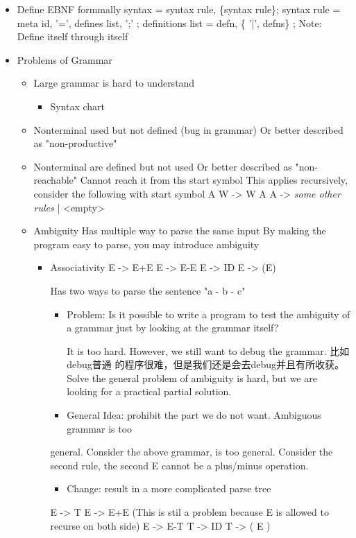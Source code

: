 \documentclass[11pt]{article}
\begin{document}
\begin{itemize}
\item Define EBNF formmally
syntax = syntax rule, \{syntax rule\};
syntax rule = meta id, '=', defines list, ';' ;
definitions list = defn, \{ '|', defns\} ;
Note: Define itself through itself

\item Problems of Grammar
\begin{itemize}
\item Large grammar is hard to understand
\begin{itemize}
\item Syntax chart
\end{itemize}
\item Nonterminal used but not defined (bug in grammar)
Or better described as "non-productive"
\item Nonterminal are defined but not used
Or better described as "non-reachable"
Cannot reach it from ths start symbol
This applies recursively, consider the following with start symbol A
W -> W A
A -> \emph{some other rules} | <empty>

\item Ambiguity
Has multiple way to parse the same input
By making the program easy to parse, you may introduce ambiguity

\begin{itemize}
\item Associativity
E -> E+E
E -> E-E
E -> ID
E -> (E)

Has two ways to parse the sentence "a - b - c"

\begin{itemize}
\item Problem: Is it possible to write a program to test the ambiguity of a
grammar just by looking at the grammar itself?

It is too hard. However, we still want to debug the grammar. 比如debug普通
的程序很难，但是我们还是会去debug并且有所收获。Solve the general problem
of ambiguity is hard, but we are looking for a practical partial solution.

\item General Idea: prohibit the part we do not want. Ambiguous grammar is too
\end{itemize}
general. Consider the above grammar, is too general. Consider the second
rule, the second E cannot be a plus/minus operation.

\begin{itemize}
\item Change: result in a more complicated parse tree
\end{itemize}
E -> T
E -> E+E (This is stil a problem because E is allowed to recurse on both side)
E -> E-T
T -> ID
T -> ( E )


\end{itemize}
\end{itemize}
\end{itemize}
\end{document}

